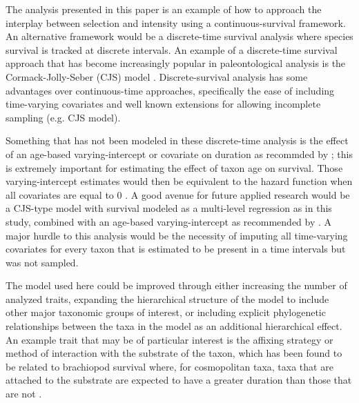 \documentclass[11pt]{article}
\begin{document}
The analysis presented in this paper is an example of how to approach the interplay between selection and intensity using a continuous-survival framework. An alternative framework would be a discrete-time survival analysis \citep{Tutz2016} where species survival is tracked at discrete intervals. An example of a discrete-time survival approach that has become increasingly popular in paleontological analysis is the Cormack-Jolly-Seber (CJS) model \citep{Royle2008,Liow2008,Tomiya2013,Liow2010b}. Discrete-survival analysis has some advantages over continuous-time approaches, specifically the ease of including time-varying covariates and well known extensions for allowing incomplete sampling (e.g. CJS model). 

Something that has not been modeled in these discrete-time analysis is the effect of an age-based varying-intercept or covariate on duration as recommded by \citet{Tutz2016}; this is extremely important for estimating the effect of taxon age on survival. Those varying-intercept estimates would then be equivalent to the hazard function when all covariates are equal to 0 \citep{Tutz2016}. A good avenue for future applied research would be a CJS-type model with survival modeled as a multi-level regression as in this study, combined with an age-based varying-intercept as recommended by \citet{Tutz2016}. A major hurdle to this analysis would be the necessity of imputing all time-varying covariates for every taxon that is estimated to be present in a time intervals but was not sampled.



The model used here could be improved through either increasing the number of analyzed traits, expanding the hierarchical structure of the model to include other major taxonomic groups of interest, or including explicit phylogenetic relationships between the taxa in the model as an additional hierarchical effect. An example trait that may be of particular interest is the affixing strategy or method of interaction with the substrate of the taxon, which has been found to be related to brachiopod survival where, for cosmopolitan taxa, taxa that are attached to the substrate are expected to have a greater duration than those that are not \citep{Alexander1977}.
\end{document}
